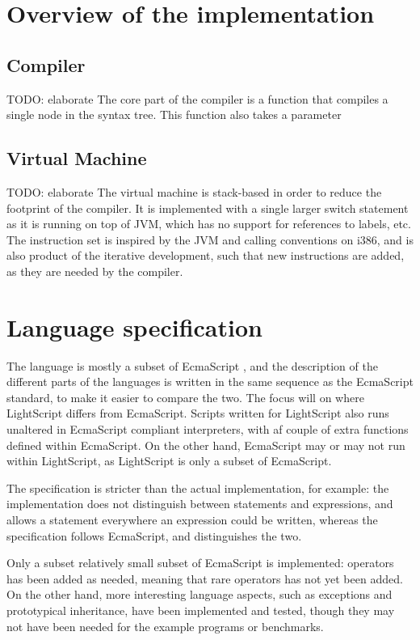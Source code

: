 \documentclass[11pt]{report}
\begin{document}
\section{Overview of the implementation}
\subsection{Compiler}
TODO: elaborate 
The core part of the compiler is a function that compiles a single node in the syntax tree. This function also takes a parameter 

\subsection{Virtual Machine}
TODO: elaborate 
The virtual machine is stack-based in order to reduce the footprint of the compiler.
It is implemented with a single larger switch statement as it is running on top of JVM, which has no support for references to labels, etc.
The instruction set is inspired by the JVM and calling conventions on i386, and is also product of the iterative development, such that new instructions are added, as they are needed by the compiler.


\section{Language specification}
The language is mostly a subset of EcmaScript \cite{ecma-262}, and the description of the different parts of the languages is written in the same sequence as the EcmaScript standard, to make it easier to compare the two. The focus will on where LightScript differs from EcmaScript.
Scripts written for LightScript also runs unaltered in EcmaScript compliant interpreters, with af couple of extra functions defined within EcmaScript. On the other hand, EcmaScript may or may not run within LightScript, as LightScript is only a subset of EcmaScript.

The specification is stricter than the actual implementation, for example: the implementation does not distinguish between statements and expressions, and allows a statement everywhere an expression could be written, whereas the specification follows EcmaScript, and distinguishes the two.

Only a subset relatively small subset of EcmaScript is implemented: operators has been added as needed, meaning that rare operators has not yet been added. 
On the other hand, more interesting language aspects, such as exceptions and prototypical inheritance, have been implemented and tested, though they may not have been needed for the example programs or benchmarks.
\end{document}
